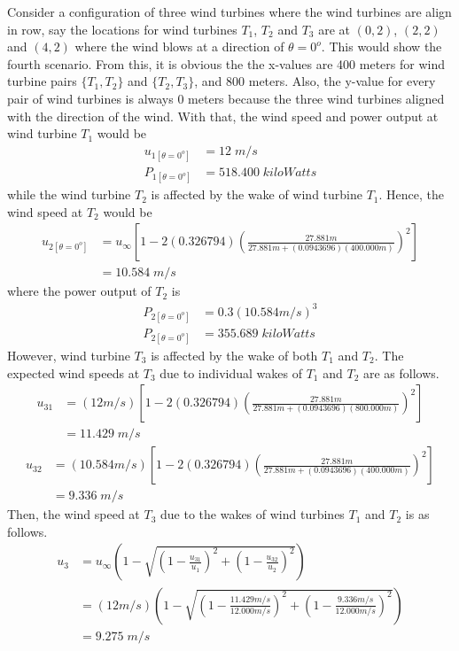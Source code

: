 	Consider a configuration of three wind turbines where the wind turbines are align in row, say the locations for wind turbines $T_1$, $T_2$ and $T_3$ are at $(0,2)$, $(2,2)$ and $(4,2)$ where the wind blows at a direction of $\theta=0^o$. This would show the fourth scenario. From this, it is obvious the the x-values are 400 meters for wind turbine pairs $\{T_1,T_2\}$ and $\{T_2,T_3\}$, and 800 meters. Also, the y-value for every pair of wind turbines is always 0 meters because the three wind turbines aligned with the direction of the wind. With that, the wind speed and power output at wind turbine $T_1$ would be
	\begin{align*}
		u_{1[\theta=0^o]} &=12\;m/s \\
		P_{1[\theta=0^o]} &=518.400\;kiloWatts
	\end{align*}
while the wind turbine $T_2$ is affected by the wake of wind turbine $T_1$. Hence, the wind speed at $T_2$ would be
	\begin{align*}
        u_{2[\theta=0^o]} &= u_\infty \left[ 1-2(0.326794)\left( \frac{27.881m}{27.881m+(0.0943696) (400.000m)} \right)^2 \right] \\
        &=10.584\;m/s
    \end{align*}
where the power output of $T_2$ is
	\begin{align*}
        P_{2[\theta=0^o]} &= 0.3(10.584m/s)^3 \\
        P_{2[\theta=0^o]} &= 355.689\;kiloWatts
    \end{align*}
However, wind turbine $T_3$ is affected by the wake of both $T_1$ and $T_2$. The expected wind speeds at $T_3$ due to individual wakes of $T_1$ and $T_2$ are as follows.
	\begin{align*}
        u_{31} &= (12m/s) \left[ 1-2(0.326794)\left( \frac{27.881m}{27.881m+(0.0943696) (800.000m)} \right)^2 \right] \\
        &=11.429\;m/s
    \end{align*}
    \begin{align*}
        u_{32} &= (10.584m/s) \left[ 1-2(0.326794)\left( \frac{27.881m}{27.881m+(0.0943696) (400.000m)} \right)^2 \right] \\
        &=9.336\;m/s
    \end{align*}
Then, the wind speed at $T_3$ due to the wakes of wind turbines $T_1$ and $T_2$ is as follows.
    \begin{align*}
        u_3 &= u_\infty\left( 1-\sqrt{\left( 1-\frac{u_{31}}{u_1} \right)^2 + \left( 1-\frac{u_{32}}{u_2} \right)^2} \right) \\
        &= (12m/s)\left( 1-\sqrt{\left( 1-\frac{11.429m/s}{12.000m/s} \right)^2 + \left( 1-\frac{9.336m/s}{12.000m/s} \right)^2} \right) \\
        &= 9.275\;m/s
    \end{align*}
